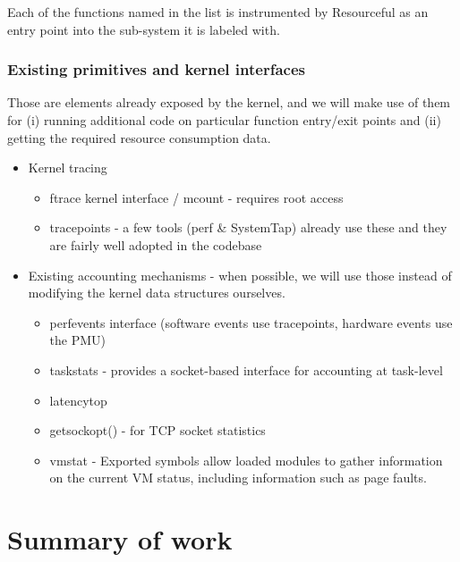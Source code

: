 \documentclass[12pt]{article}
\def\_{\textunderscore\-}
\begin{document}
  Each of the functions named in the list is instrumented by Resourceful as an entry point into the sub-system it is labeled with.
  
  \subsubsection{Existing primitives and kernel interfaces}
  Those are elements already exposed by the kernel, and we will make use of them for (i) running additional code on particular function entry/exit points and (ii) getting the required resource consumption data.
  
  \begin{itemize}
  \item Kernel tracing
  	\begin{itemize}
  	\item ftrace kernel interface / mcount - requires root access
  	\item tracepoints - a few tools (perf \& SystemTap) already use these and they are fairly well adopted in the codebase
  	\end{itemize}
  \item Existing accounting mechanisms - when possible, we will use those instead of modifying the kernel data structures ourselves.
  	\begin{itemize}
  	\item perf\_events interface (software events use tracepoints, hardware events use the PMU)
  	\item taskstats \cite{taskstats} - provides a socket-based interface for accounting at task-level
  	\item latencytop \cite{latencytop}
  	\item getsockopt() - for TCP socket statistics
  	\item vmstat - Exported symbols allow loaded modules to gather information on the current VM status, including information such as page faults.
  	\end{itemize}
  \end{itemize}

  \section{Summary of work}
\end{document}
